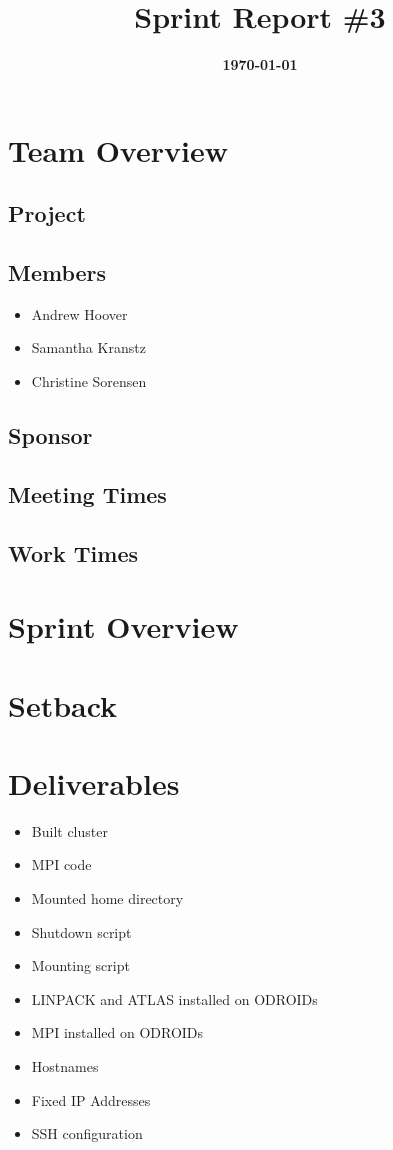 \documentclass{article}
\title{\normalfont\Large\bfseries\color{TitleColor}Sprint Report \#3}
\date{\normalfont\bfseries\color{TitleColor}\today}
\begin{document}
\maketitle

\section*{Team Overview}
\subsection*{Project}

\subsection*{Members}
\begin{itemize}
	\item Andrew Hoover
	\item Samantha Kranstz
	\item Christine Sorensen
\end{itemize}

\subsection*{Sponsor}

\subsection*{Meeting Times}
\subsection*{Work Times}

\section*{Sprint Overview}

\section*{Setback}


\section*{Deliverables}
\begin{itemize}
	\item Built cluster
	\item MPI code
	\item Mounted home directory
	\item Shutdown script
	\item Mounting script
	\item LINPACK and ATLAS installed on ODROIDs
	\item MPI installed on ODROIDs
	\item Hostnames
	\item Fixed IP Addresses
	\item SSH configuration
\end{itemize}
\end{document}
